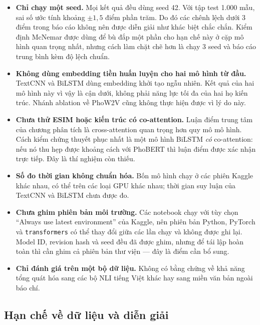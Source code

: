 \documentclass[12pt,a4paper,oneside]{report}
\begin{document}
\begin{itemize}[leftmargin=*,itemsep=3pt]
  \item \textbf{Chỉ chạy một seed.} Mọi kết quả đều dùng seed 42. Với tập test 1.000 mẫu,
        sai số ước tính khoảng $\pm 1{,}5$ điểm phần trăm. Do đó các chênh lệch dưới 3
        điểm trong báo cáo không nên được diễn giải như khác biệt chắc chắn. Kiểm định
        McNemar được dùng để bù đắp một phần cho hạn chế này ở cặp mô hình quan trọng
        nhất, nhưng cách làm chặt chẽ hơn là chạy 3 seed và báo cáo trung bình kèm độ
        lệch chuẩn.
  \item \textbf{Không dùng embedding tiền huấn luyện cho hai mô hình từ đầu.} TextCNN và
        BiLSTM dùng embedding khởi tạo ngẫu nhiên. Kết quả của hai mô hình này vì vậy là
        cận dưới, không phải năng lực tối đa của hai họ kiến trúc. Nhánh ablation về
        PhoW2V cũng không thực hiện được vì lý do này.
  \item \textbf{Chưa thử ESIM hoặc kiến trúc có co-attention.} Luận điểm trung tâm của
        chương phân tích là cross-attention quan trọng hơn quy mô mô hình. Cách kiểm chứng
        thuyết phục nhất là một mô hình BiLSTM \textit{có} co-attention: nếu nó thu hẹp
        được khoảng cách với PhoBERT thì luận điểm được xác nhận trực tiếp. Đây là thí
        nghiệm còn thiếu.
  \item \textbf{Số đo thời gian không chuẩn hóa.} Bốn mô hình chạy ở các phiên Kaggle khác
        nhau, có thể trên các loại GPU khác nhau; thời gian suy luận của TextCNN và BiLSTM
        chưa được đo.
  \item \textbf{Chưa ghim phiên bản môi trường.} Các notebook chạy với tùy chọn ``Always
        use latest environment'' của Kaggle, nên phiên bản Python, PyTorch và
        \texttt{transformers} có thể thay đổi giữa các lần chạy và không được ghi lại.
        Model ID, revision hash và seed đều đã được ghim, nhưng để tái lập hoàn toàn thì
        cần ghim cả phiên bản thư viện --- đây là điểm cần bổ sung.
  \item \textbf{Chỉ đánh giá trên một bộ dữ liệu.} Không có bằng chứng về khả năng tổng
        quát hóa sang các bộ NLI tiếng Việt khác hay sang miền văn bản ngoài báo chí.
\end{itemize}

\subsection{Hạn chế về dữ liệu và diễn giải}
\end{document}
